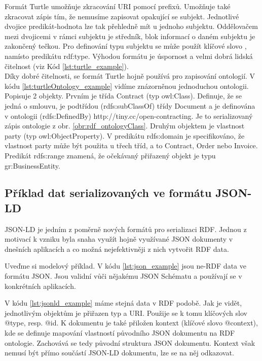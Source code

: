 Formát Turtle umožňuje zkracování URI pomocí prefixů. Umožňuje také zkracovat zápis tím, že nemusíme zapisovat opakující se subjekt. Jednotlivé dvojice predikát-hodnota lze tak přehledně mít u jednoho subjektu. Oddělovačem mezi dvojicemi v rámci subjektu je středník, blok informací o daném subjektu je zakončený tečkou. Pro definování typu subjektu se může použít klíčové slovo , namísto predikátu rdf:type. Výhodou formátu je úspornost a velmi dobrá lidská čitelnost (viz Kód \ref{lst:turtle_example}).\\



Díky dobré čitelnosti, se formát Turtle hojně používá pro zapisování ontologií. V kódu \ref{lst:turtleOntology_example} vidíme znázorněnou jednoduchou ontologii. Popisuje 2 objekty. Prvním je třída Contract (typ owl:Class). Definuje, že se jedná o smlouvu, je podtřídou (rdfs:subClassOf) třídy Document a je definována v ontologii (rdfs:DefinedBy) http://tiny.cc/open-contracting. Je to serializovaný zápis ontologie z obr. \ref{obr:rdf_ontologyClass}. Druhým objektem je vlastnost party (typ owl:ObjectProperty). V predikátu rdfs:domain je specifikováno, že vlastnost party může být použita u třech tříd, a to Contract, Order nebo Invoice. Predikát rdfs:range znamená, že očekávaný přiřazený objekt je typu gr:BusinessEntity.\\



\subsection{Příklad dat serializovaných ve formátu JSON-LD}

JSON-LD je jedním z poměrně nových formátů pro serializaci RDF. Jednou z motivací k vzniku byla snaha využít hojně využívané JSON dokumenty v dnešních aplikacích a co možná nejefektivněji z nich vytvořit RDF data.

Uveďme si modelový příklad. V kódu \ref{lst:json_example} jsou ne-RDF data ve formátu JSON. Jsou validní vůči nějakému JSON Schématu a používají se v konkrétních aplikacích.  

V kódu \ref{lst:jsonld_example} máme stejná data v RDF podobě. Jak je vidět, jednotlivým objektům je přiřazen typ a URI. Použije se k tomu klíčových slov @type, resp. @id. K dokumentu je také přiložen kontext (klíčové slovo @context), kde se definuje mapování vlastností původního JSON dokumentu na RDF ontologie. Zachovává se tedy původní struktura JSON dokumentu. Kontext však nemusí být přímo součástí JSON-LD dokumentu, lze se na něj odkazovat. 

